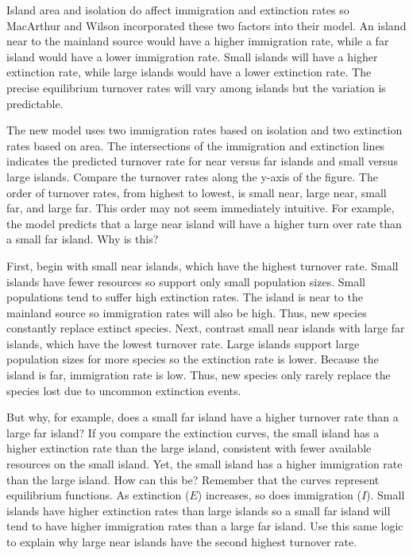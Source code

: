 \documentclass[letterpaper]{tufte-handout}
\begin{document}
Island area and isolation do affect immigration and extinction rates so MacArthur and Wilson incorporated these two factors into their model. An island near to the mainland source would have a higher immigration rate, while a far island would have a lower immigration rate.  Small islands will have a higher extinction rate, while large islands would have a lower extinction rate.  The precise equilibrium turnover rates will vary among islands but the variation is predictable.

The new model uses two immigration rates based on isolation and two extinction rates based on area. The intersections of the immigration and extinction lines indicates the predicted turnover rate for near versus far islands and small versus large islands. Compare the turnover rates along the y-axis of the figure. The order of turnover rates, from highest to lowest, is small near, large near, small far, and large far. This order may not seem immediately intuitive. For example, the model predicts that a large near island will have a higher turn over rate than a small far island.  Why is this?

First, begin with small near islands, which have the highest turnover rate. Small islands have fewer resources so support only small population sizes. Small populations tend to suffer high extinction rates. The island is near to the mainland source so immigration rates will also be high. Thus, new species constantly replace extinct species.  Next, contrast small near islands with large far islands, which have the lowest turnover rate. Large islands support large population sizes for more species so the extinction rate is lower. Because the island is far, immigration rate is low. Thus, new species only rarely replace the species lost due to uncommon extinction events.  

But why, for example, does a small far island have a higher turnover rate than a large far island?  If you compare the extinction curves, the small island has a higher extinction rate than the large island, consistent with fewer available resources on the small island. Yet, the small island has a higher immigration rate than the large island. How can this be? Remember that the curves represent equilibrium functions. As extinction ($E$) increases, so does immigration ($I$). Small islands have higher extinction rates than large islands so a small far island will tend to have higher immigration rates than a large far island.  Use this same logic to explain why large near islands have the second highest turnover rate.
\end{document}
